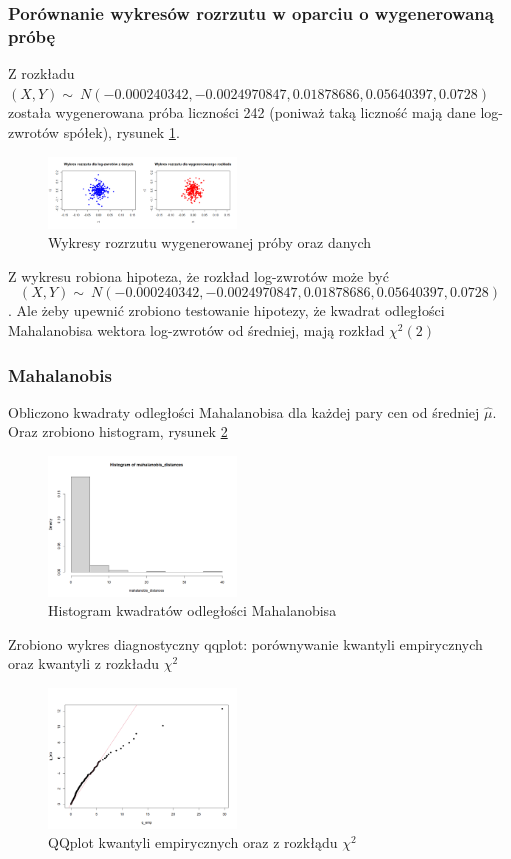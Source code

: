 \documentclass[a4paper,11pt]{article}
\begin{document}
\subsubsection{Porównanie wykresów rozrzutu w oparciu o wygenerowaną próbę}
Z rozkładu $(X, Y) \sim\ N(-0.000240342, -0.0024970847, 0.01878686, 0.05640397, 0.0728)$ została wygenerowana próba liczności 242 (poniważ taką liczność mają dane log-zwrotów spółek), rysunek \ref{fig:wykresy_rozrzutu}.
\begin{figure}[!htb]
	\centering
	\includegraphics[width=5cm]{wykres_rozrzutu_porownanie.png}
	\caption{Wykresy rozrzutu wygenerowanej próby oraz danych }
         \label{fig:wykresy_rozrzutu}
\end{figure}
Z wykresu robiona hipoteza, że rozkład log-zwrotów może być $$(X, Y) \sim\ N(-0.000240342, -0.0024970847, 0.01878686, 0.05640397, 0.0728)$$. Ale żeby upewnić  zrobiono testowanie hipotezy, że kwadrat odległości Mahalanobisa wektora log-zwrotów od
średniej, mają rozkład $ \chi^2(2)$
\subsubsection{Mahalanobis}

Obliczono kwadraty odległości Mahalanobisa dla każdej pary cen od średniej $ \hat{\mu} $. Oraz zrobiono histogram, rysunek \ref{fig:mahalanobis_hist}

\begin{figure}[!htb]
	\centering
	\includegraphics[width=5cm]{mahalanobis_hist.png}
	\caption{Histogram kwadratów odległości Mahalanobisa }
         \label{fig:mahalanobis_hist}
\end{figure}


Zrobiono wykres diagnostyczny qqplot: porównywanie kwantyli empirycznych oraz kwantyli z rozkładu $ \chi^2$

\begin{figure}[!htb]
	\centering
	\includegraphics[width=5cm]{mahalanobis_qqplot.png}
	\caption{QQplot kwantyli empirycznych oraz z rozkłądu  $ \chi^2$ }
         \label{fig:mahalanobis_qqplot}
\end{figure}
\end{document}
